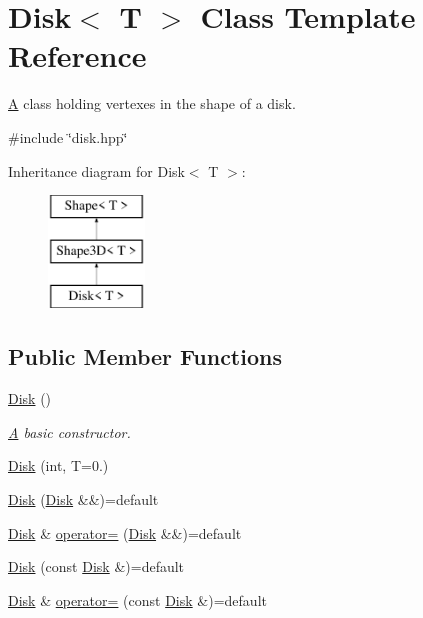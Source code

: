 \hypertarget{classDisk}{}\section{Disk$<$ T $>$ Class Template Reference}
\label{classDisk}


\mbox{\hyperlink{classA}{A}} class holding vertexes in the shape of a disk.  




{\ttfamily \#include \char`\"{}disk.\+hpp\char`\"{}}

Inheritance diagram for Disk$<$ T $>$\+:\begin{figure}[H]
\begin{center}
\leavevmode
\includegraphics[height=3.000000cm]{classDisk}
\end{center}
\end{figure}
\subsection*{Public Member Functions}
\begin{DoxyCompactItemize}
\item 
\mbox{\hyperlink{classDisk_a88bcdb9bf91c8e9c18cdf551e558ab8c}{Disk}} ()
\begin{DoxyCompactList}\small\item\em \mbox{\hyperlink{classA}{A}} basic constructor. \end{DoxyCompactList}\item 
\mbox{\hyperlink{classDisk_af73e1930d8da87b05c813814532dd43a}{Disk}} (int, T=0.)
\item 
\mbox{\hyperlink{classDisk_a893da931e3f39c126c434ab2fc2e12cc}{Disk}} (\mbox{\hyperlink{classDisk}{Disk}} \&\&)=default
\item 
\mbox{\hyperlink{classDisk}{Disk}} \& \mbox{\hyperlink{classDisk_ad6bc474ffecbc5de6f8fdd90ba5eddfe}{operator=}} (\mbox{\hyperlink{classDisk}{Disk}} \&\&)=default
\item 
\mbox{\hyperlink{classDisk_a96de79b2e115c478a33cc31f4818aee9}{Disk}} (const \mbox{\hyperlink{classDisk}{Disk}} \&)=default
\item 
\mbox{\hyperlink{classDisk}{Disk}} \& \mbox{\hyperlink{classDisk_a3ef862dd6e4671c907e2368bb5239bd2}{operator=}} (const \mbox{\hyperlink{classDisk}{Disk}} \&)=default
\end{DoxyCompactItemize}
